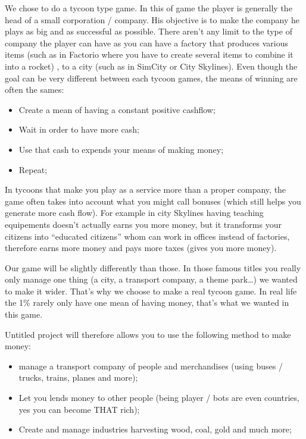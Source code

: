 \documentclass[a4paper, 11pt] {article}
\begin{document}
    \par
    We chose to do a tycoon type game. In this of game the player is generally the head of a small corporation / company. His objective is to make the company he plays as big and as successful as possible. There aren’t any limit to the type of company the player can have as you can have a factory that produces various items (such as in Factorio where you have to create several items to combine it into a rocket) , to a city (such as in SimCity or City Skylines). Even though the goal can be very different between each tycoon games, the means of winning are often the sames:
    \begin{itemize}
        \item Create a mean of having a constant positive cashflow;
        \item Wait in order to have more cash;
        \item Use that cash to expends your means of making money;
        \item Repeat;
    \end{itemize}\par

    In tycoons that make you play as a service more than a proper company, the game often takes into account what you might call bonuses (which still helps you generate more cash flow). For example in city Skylines having teaching equipements doesn’t actually earns you more money, but it transforms your citizens into “educated citizens” whom can work in offices instead of factories, therefore earns more money and pays more taxes (gives you more money).\par

     Our game will be slightly differently than those. In those famous titles you really only manage one thing (a city, a transport company, a theme park…) we wanted to make it wider. That’s why we choose to make a real tycoon game. In real life the 1\% rarely only have one mean of having money, that’s what we wanted in this game.\par

     Untitled project will therefore allows you to use the following method to make money:
     \begin{itemize}
        \item manage a transport company of people and merchandises (using buses / trucks, trains, planes and more);
        \item Let you lends money to other people (being player / bots are even countries, yes you can become THAT rich);
        \item Create and manage industries harvesting wood, coal, gold and much more;
    \end{itemize}\par
\end{document}
